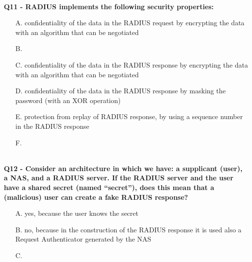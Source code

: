 \textbf{\\Q11 - RADIUS implements the following security properties:}
\begin{itemize}
    \item[A.] confidentiality of the data in the RADIUS request by encrypting the data with an algorithm that can be negotiated
    \item[B.] 
    \item[C.] confidentiality of the data in the RADIUS response by encrypting the data with an algorithm that can be negotiated
    \item[D.] confidentiality of the data in the RADIUS response by masking the password (with an XOR operation)
    \item[E.] protection from replay of RADIUS response, by using a sequence number in the RADIUS response
    \item[F.] 
\end{itemize}

\textbf{\\Q12 - Consider an architecture in which we have: a supplicant (user), a NAS, and a RADIUS server. If the
RADIUS server and the user have a shared secret (named “secret”), does this mean that a (malicious) user can create
a fake RADIUS response?}
\begin{itemize}
    \item[A.] yes, because the user knows the secret
    \item[B.] no, because in the construction of the RADIUS response it is used also a Request Authenticator generated by the NAS
    \item[C.] 
\end{itemize}

